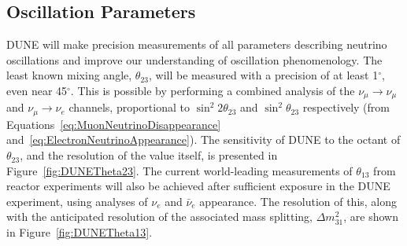 \subsection{Oscillation Parameters}\label{sec:DUNEOscillationParameters}

DUNE will make precision measurements of all parameters describing neutrino oscillations and improve our understanding of oscillation phenomenology.  The least known mixing angle, $\theta_{23}$, will be measured with a precision of at least 1$^{\circ}$, even near 45$^{\circ}$.  This is possible by performing a combined analysis of the $\nu_{\mu}\rightarrow\nu_{\mu}$ and $\nu_{\mu}\rightarrow\nu_e$ channels, proportional to $\sin^2{2\theta_{23}}$ and $\sin^2{\theta_{23}}$ respectively (from Equations~\ref{eq:MuonNeutrinoDisappearance} and~\ref{eq:ElectronNeutrinoAppearance}).  The sensitivity of DUNE to the octant of $\theta_{23}$, and the resolution of the value itself, is presented in Figure~\ref{fig:DUNETheta23}.  The current world-leading measurements of $\theta_{13}$ from reactor experiments will also be achieved after sufficient exposure in the DUNE experiment, using analyses of $\nu_e$ and $\bar{\nu}_e$ appearance.  The resolution of this, along with the anticipated resolution of the associated mass splitting, $\Delta m_{31}^2$, are shown in Figure~\ref{fig:DUNETheta13}.

